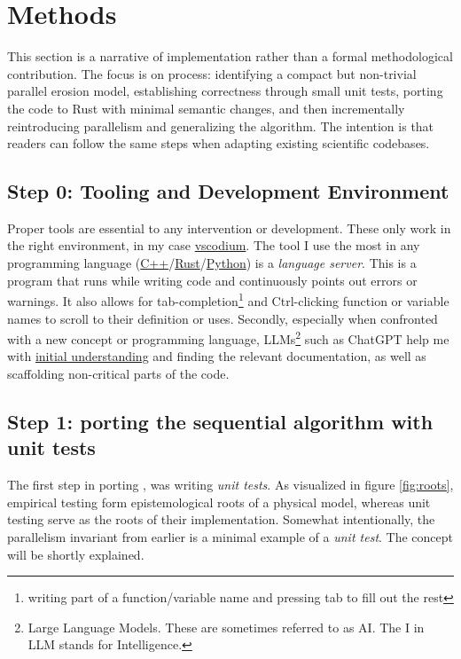 \documentclass[a4paper]{article} %
\begin{document}
\section{Methods}

This section is a narrative of implementation rather than a formal methodological contribution. The focus is on process: identifying a compact but non-trivial parallel erosion model, establishing correctness through small unit tests, porting the code to Rust with minimal semantic changes, and then incrementally reintroducing parallelism and generalizing the algorithm. The intention is that readers can follow the same steps when adapting existing scientific codebases.

\subsection{Step 0: Tooling and Development Environment}

Proper tools are essential to any intervention or development. These only work in the right environment, in my case \href{https://vscodium.com/}{vscodium}. The tool I use the most in any programming language (\href{https://open-vsx.org/vscode/item?itemName=llvm-vs-code-extensions.vscode-clangd}{C++}/\href{https://open-vsx.org/vscode/item?itemName=rust-lang.rust-analyzer}{Rust}/\href{https://open-vsx.org/vscode/item?itemName=astral-sh.ty}{Python}) is a \textit{language server}. This is a program that runs while writing code and continuously points out errors or warnings. It also allows for tab-completion\footnote{writing part of a function/variable name and pressing tab to fill out the rest} and Ctrl-clicking function or variable names to scroll to their definition or uses. Secondly, especially when confronted with a new concept or programming language, LLMs\footnote{Large Language Models. These are sometimes referred to as AI. The I in LLM stands for Intelligence.} such as ChatGPT help me with \href{https://en.wikipedia.org/wiki/Rubber_duck_debugging}{initial understanding} and finding the relevant documentation, as well as scaffolding non-critical parts of the code.

\subsection{Step 1: porting the sequential algorithm with unit tests}

The first step in porting \cite{barnesAcceleratingFluvialIncision2019}, was writing \textit{unit tests}. As visualized in figure \ref{fig:roots}, empirical testing form epistemological roots of a physical model, whereas unit testing serve as the roots of their implementation. Somewhat intentionally, the parallelism invariant from earlier is a minimal example of a \textit{unit test}. The concept will be shortly explained.
\end{document}
